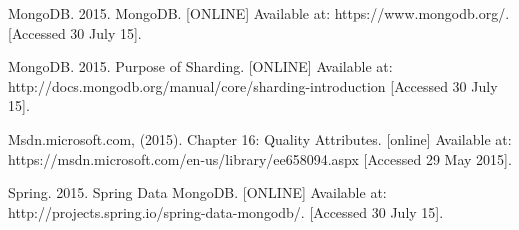 \begin{flushleft}

\begin{thebibliography}{99}
	 MongoDB. 2015. MongoDB. [ONLINE] Available at: https://www.mongodb.org/. [Accessed 30 July 15].
	
	 MongoDB. 2015. Purpose of Sharding. [ONLINE] Available at: http://docs.mongodb.org/manual/core/sharding-introduction [Accessed 30 July 15].
	
	 Msdn.microsoft.com, (2015). Chapter 16: Quality Attributes. [online]  Available at: https://msdn.microsoft.com/en-us/library/ee658094.aspx [Accessed 29 May 2015].
	
	 Spring. 2015. Spring Data MongoDB. [ONLINE] Available at: http://projects.spring.io/spring-data-mongodb/. [Accessed 30 July 15].
	
	

\end{thebibliography}
\end{flushleft}
